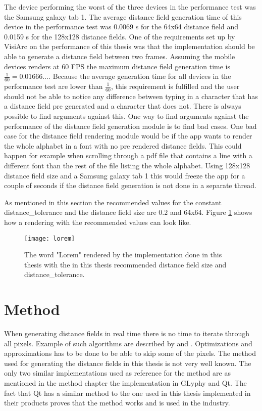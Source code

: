 The device performing the worst of the three devices in the performance test was the Samsung galaxy tab 1. The average distance field generation time of this device in the performance test was 0.0069 s for the 64x64 distance field and 0.0159 s for the 128x128 distance fields. One of the requirements set up by VisiArc on the performance of this thesis was that the implementation should be able to generate a distance field between two frames. Assuming the mobile devices renders at 60 FPS the maximum distance field generation time is $\frac{1}{60}=0.01666\dots$. Because the average generation time for all devices in the performance test are lower than $\frac{1}{60}$, this requirement is fulfilled and the user should not be able to notice any difference between typing in a character that has a distance field pre generated and a character that does not. There is always possible to find arguments against this. One way to find arguments against the performance of the distance field generation module is to find bad cases. One bad case for the distance field rendering module would be if the app wants to render the whole alphabet in a font with no pre rendered distance fields. This could happen for example when scrolling through a pdf file that contains a line with a different font than the rest of the file listing the whole alphabet. Using 128x128 distance field size and a Samsung galaxy tab 1 this would freeze the app for a couple of seconds if the distance field generation is not done in a separate thread.

As mentioned in this section the recommended values for the constant distance\_tolerance and the distance field size are $0.2$ and 64x64. Figure \ref{fig:recommendation} shows how a rendering with the recommended values can look like.

\begin{figure}[H]
\texttt{[image: lorem]}
\caption{The word "Lorem" rendered by the implementation done in this thesis with the in this thesis recommended distance field size and distance\_tolerance.}
\label{fig:recommendation}
\end{figure}


\section{Method}
When generating distance fields in real time there is no time to iterate through all pixels. Example of such algorithms are described by \citet{meijster} and \citet{Danielsson}. Optimizations and approximations has to be done to be able to skip some of the pixels. The method used for generating the distance fields in this thesis is not very well known. The only two similar implementations used as reference for the method are as mentioned in the method chapter the implementation in GLyphy and Qt. The fact that Qt has a similar method to the one used in this thesis implemented in their products proves that the method works and is used in the industry. 

